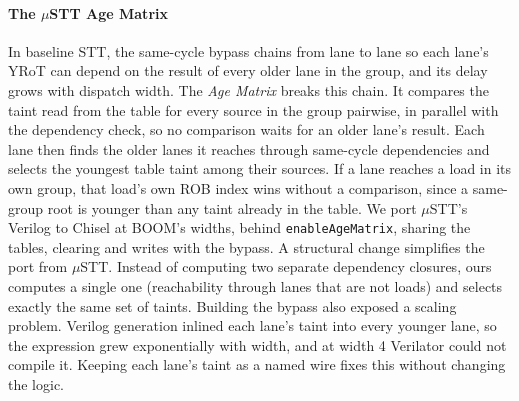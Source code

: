 \paragraph{The $\mu$STT Age Matrix}
In baseline STT, the same-cycle bypass chains from lane to lane so each lane's
YRoT can depend on the result of every older lane in the group, and its delay
grows with dispatch width. The \emph{Age Matrix} breaks this chain. It
compares the taint read from the table for every source in the group pairwise,
in parallel with the dependency check, so no comparison waits for an older
lane's result. Each lane then finds the older lanes it reaches through
same-cycle dependencies and selects the youngest table taint among their
sources. If a lane reaches a load in its own group, that load's own ROB index
wins without a comparison, since a same-group root is younger than any taint
already in the table. We port $\mu$STT's Verilog to Chisel at BOOM's widths,
behind \texttt{enableAgeMatrix}, sharing the tables, clearing and writes with
the bypass. A structural change simplifies the port from $\mu$STT. 
Instead of computing two separate dependency closures, ours computes a single one 
(reachability through lanes that are not loads) and selects exactly the same set of
taints. Building the bypass also exposed a scaling problem. Verilog
generation inlined each lane's taint into every younger lane, so the
expression grew exponentially with width, and at width 4 Verilator could not
compile it. Keeping each lane's taint as a named wire fixes this without
changing the logic.
